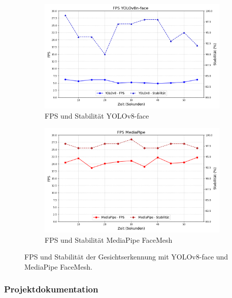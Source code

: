 \begin{figure}
    \centering
    \begin{subfigure}{0.48\textwidth}
        \centering
        \includegraphics[width=\textwidth]{data/fps_yolo_detection.png}
        \caption{FPS und Stabilität YOLOv8-face}
        \label{fig:fps_yolo_detection}
    \end{subfigure}
    \begin{subfigure}{0.48\textwidth}
        \centering
        \includegraphics[width=\textwidth]{data/fps_mediapipe_detection.png}
        \caption{FPS und Stabilität MediaPipe FaceMesh}
        \label{fig:fps_mediapipe_detection}
    \end{subfigure}
    \caption{FPS und Stabilität der Gesichtserkennung mit YOLOv8-face und MediaPipe FaceMesh.}
    \label{fig:fps_comparison}
\end{figure}



\subsubsection{Projektdokumentation}


